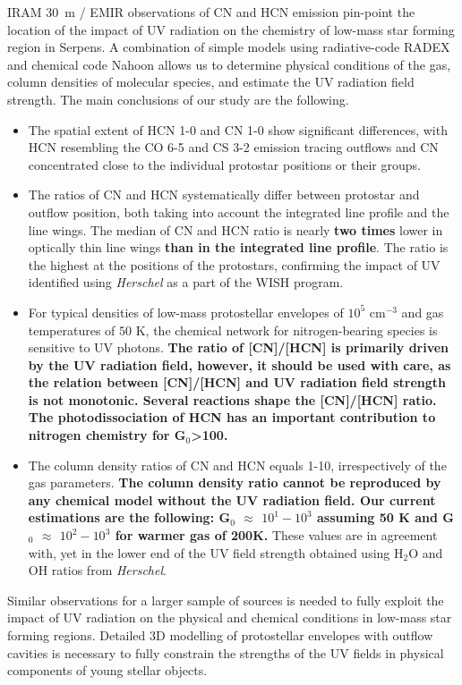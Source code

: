 \documentclass{aa}
\begin{document}
IRAM 30~m / EMIR observations of CN and HCN emission pin-point the location 
of the impact of UV radiation on the chemistry of low-mass star forming region in Serpens. 
A combination of simple models using radiative-code RADEX and chemical code Nahoon 
allows us to determine physical conditions of the gas, column densities of molecular species,
and estimate the UV radiation field strength. The main conclusions of our study are the 
following. 
\begin{itemize} 
\item The spatial extent of HCN 1-0 and CN 1-0 show significant differences, with 
HCN resembling the CO 6-5 and CS 3-2 emission tracing outflows and CN concentrated close to the individual protostar positions or their groups.
\item The ratios of CN and HCN systematically differ between protostar and outflow position,
both taking into account the integrated line profile and the line wings. The median of CN and HCN ratio is nearly \textbf{two times} lower in optically thin line wings \textbf{than in the integrated line profile}. The ratio 
is the highest at the positions of the protostars, confirming the impact of UV identified 
using \textit{Herschel} as a part of the WISH program. 
\item For typical densities of low-mass protostellar envelopes of $10^5$ cm$^{-3}$ and 
gas temperatures of $50$ K, the chemical network for nitrogen-bearing species is sensitive to UV photons. \textbf{The ratio of [CN]/[HCN] is primarily driven by the UV radiation field, however, it should be used with care, as the relation between [CN]/[HCN] and UV radiation field strength is not monotonic. Several reactions shape the [CN]/[HCN] ratio. The photodissociation of HCN has an important contribution to nitrogen chemistry for G$_0$>100.}
\item The column density ratios of CN and HCN equals 1-10, irrespectively of the gas parameters. \textbf{The column density ratio cannot be reproduced by any chemical model without the UV radiation field. Our current estimations are the following: G$_0$ $\approx$ $10^{1}-10^{3}$ assuming 50 K and G$_0$ $\approx$ $10^{2}-10^{3}$ for warmer gas of 200K.}
These values are in agreement with, yet in the lower end of the UV field strength obtained using 
H$_2$O and OH ratios from \textit{Herschel}.
\end{itemize}

Similar observations for a larger sample of sources is needed to fully exploit 
the impact of UV radiation on the physical and chemical conditions in low-mass star 
forming regions. Detailed 3D modelling of protostellar envelopes with outflow cavities 
is necessary to fully constrain the strengths of the UV fields in physical components 
of young stellar objects.
\end{document}
